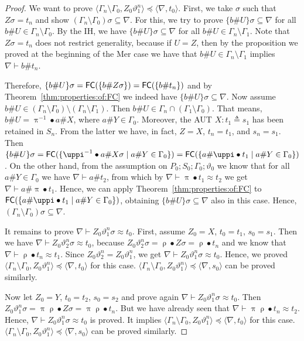 \documentclass[11pt,a4paper]{amsart}
\theoremstyle{definition}
\newcommand{\frN}{\mathfrak N}
\newcommand{\permef}{\bullet}
\newcommand\ppi{\uppi}
\newcommand\prho{\uprho}
\newcommand{\np}[2]{\langle #1, \allowbreak #2\rangle}
\newcommand{\nablag}{\Gamma}
\newcommand{\fe}{{\sf FC}}
\begin{document}
\begin{proof}
We want to prove $\np{\nablag_n\setminus
  \nablag_0}{Z_0\vartheta_1^n}\preceq \np{\nabla}{t_0}$. First, we
take $\sigma$ such that $Z\sigma=t_n$ and show $(\Gamma_n\setminus
\Gamma_0)\sigma\subseteq \nabla$. For this, we try to prove
$\{b\#U\}\sigma \subseteq \nabla$ for all $b\#U\in \Gamma_n\setminus
\Gamma_0$. By the IH, we have $\{b\#U\}\sigma \subseteq \nabla$ for
all $b\#U\in \Gamma_n\setminus \Gamma_1$. Note that $Z\sigma=t_n$ does
not restrict generality, because if $U=Z$, then by the proposition we proved at the beginning of the {\sf Mer} case
we have that $b\#U\in \Gamma_n\setminus \Gamma_1$ implies
$\nabla\vdash b\# t_n$. 

Therefore, $\{b\#U\}\sigma ={\fe}(\{b\#
Z\sigma\}) = {\fe}(\{b\# t_n\})$ and by
Theorem~\ref{thm:properties:of:FC} we indeed have $\{b\#U\}\sigma
\subseteq \nabla$. Now assume $b\#U\in (\Gamma_n \setminus \Gamma_0)
\setminus (\Gamma_n\setminus \Gamma_1)$. Then $b\# U\in \Gamma_n\cap
(\Gamma_1\setminus \Gamma_0)$. That means, $b\# U= \ppi^{-1}\permef a
\# X$, where $a\# Y \in \Gamma_0$. Moreover, the AUT $X:t_1\triangleq
s_1$ has been retained in $S_n$. From the latter we have, in fact,
$Z=X$, $t_n=t_1$, and $s_n=s_1$. Then $\{b\#U\}\sigma =
{\fe}(\{\ppi^{-1}\permef a \# X\sigma \mid a\# Y \in \Gamma_0\}) =
{\fe}(\{a \# \ppi \permef t_1 \mid a\# Y \in \Gamma_0\})$. On the
other hand, from the assumption on $P_0;S_0;\Gamma_0;\vartheta_0$ we know that for all $a \# Y\in
\Gamma_0$ we have $\nabla \vdash a \# t_2$,
from which by $\nabla
\vdash \ppi \permef t_1 \approx t_2$ we get $\nabla \vdash a \# \ppi
\permef t_1$. Hence, we can apply Theorem~\ref{thm:properties:of:FC}
to ${\fe}(\{a \# \ppi \permef t_1 \mid a\# Y \in \Gamma_0\})$,
obtaining $\{b\#U\}\sigma\subseteq \nabla$ also in this case. Hence,
$(\Gamma_n\setminus \Gamma_0)\sigma\subseteq \nabla$.

It remains to prove $\nabla \vdash Z_0\vartheta_1^n\sigma \approx
t_0$. First, assume $Z_0=X$, $t_0=t_1$, $s_0=s_1$. Then we have
$\nabla \vdash Z_0\vartheta_2^n\sigma \approx t_0$, because
$Z_0\vartheta_2^n\sigma = \prho\permef Z\sigma = \prho \permef t_n$
and we know that $\nabla \vdash \prho \permef t_n \approx t_1$. Since
$Z_0\vartheta_2^n=Z_0\vartheta_1^n$, we get $\nabla \vdash
Z_0\vartheta_1^n\sigma \approx t_0$. Hence, we proved
$\np{\nablag_n\setminus \nablag_0}{Z_0\vartheta_1^n}\preceq
\np{\nabla}{t_0}$ for this case. $\np{\nablag_n\setminus
  \nablag_0}{Z_0\vartheta_1^n}\preceq \np{\nabla}{s_0}$ can be proved
similarly.



Now let $Z_0=Y$, $t_0=t_2$, $s_0=s_2$ and prove again $\nabla \vdash
Z_0\vartheta_1^n\sigma \approx t_0$. Then $Z_0\vartheta_1^n\sigma =
\ppi \prho \permef Z \sigma = \ppi \prho \permef
t_n$. But we have already seen that $\nabla \vdash \ppi\prho
\permef t_n \approx t_2$. Hence, $\nabla \vdash Z_0\vartheta_1^n\sigma
\approx t_0$ is proved. It implies $\np{\nablag_n\setminus
  \nablag_0}{Z_0\vartheta_1^n}\preceq \np{\nabla}{t_0}$ for this
case. $\np{\nablag_n\setminus \nablag_0}{Z_0\vartheta_1^n}\preceq
\np{\nabla}{s_0}$ can be proved similarly.
\end{proof}
\end{document}
